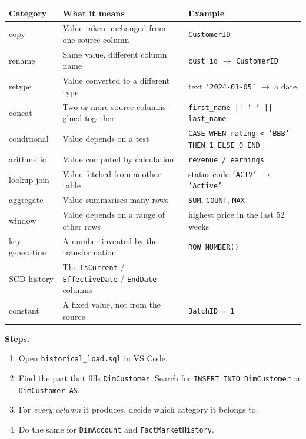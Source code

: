 \documentclass[11pt,a4paper]{article}
\newcommand{\code}[1]{\texttt{\small #1}}
\begin{document}
\begin{center}\small
\begin{tabular}{@{}lL{7.4cm}L{5.0cm}@{}}
\toprule
\textbf{Category} & \textbf{What it means} & \textbf{Example} \\
\midrule
copy & Value taken unchanged from one source column & \code{CustomerID} \\
rename & Same value, different column name & \code{cust\_id} $\rightarrow$ \code{CustomerID} \\
retype & Value converted to a different type & text \code{'2024-01-05'} $\rightarrow$ a date \\
concat & Two or more source columns glued together & \code{first\_name || ' ' || last\_name} \\
conditional & Value depends on a test & \code{CASE WHEN rating < 'BBB' THEN 1 ELSE 0 END} \\
arithmetic & Value computed by calculation & \code{revenue / earnings} \\
lookup join & Value fetched from another table & status code \code{'ACTV'} $\rightarrow$ \code{'Active'} \\
aggregate & Value summarises many rows & \code{SUM}, \code{COUNT}, \code{MAX} \\
window & Value depends on a range of other rows & highest price in the last 52 weeks \\
key generation & A number invented by the transformation & \code{ROW\_NUMBER()} \\
SCD history & The \code{IsCurrent} / \code{EffectiveDate} / \code{EndDate} columns & --- \\
constant & A fixed value, not from the source & \code{BatchID = 1} \\
\bottomrule
\end{tabular}
\end{center}

\textbf{Steps.}

\begin{enumerate}
\item Open \code{historical\_load.sql} in VS Code.
\item Find the part that fills \code{DimCustomer}. Search for
  \code{INSERT INTO DimCustomer} or \code{DimCustomer AS}.
\item For \emph{every column} it produces, decide which category it belongs to.
\item Do the same for \code{DimAccount} and \code{FactMarketHistory}.
\end{enumerate}
\end{document}
